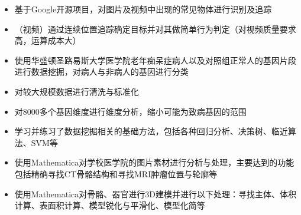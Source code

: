 \documentclass[9pt,a4paper]{altacv}
\begin{document}
\begin{fullwidth}
\begin{multicols}{2}
		\divider
		
		
		
		\begin{itemize}
			\item 基于Google开源项目，对图片及视频中出现的常见物体进行识别及追踪
			\item （视频）通过连续位置追踪确定目标并对其做简单行为判定（对视频质量要求高，运算成本大）
		\end{itemize}
		
		\divider
		
		\begin{itemize}
			\item 使用华盛顿圣路易斯大学医学院老年痴呆症病人以及对照组正常人的基因片段进行数据挖掘，对病人与非病人的基因进行分类
			\item 对较大规模数据进行清洗与标准化
			\item 对8000多个基因维度进行维度分析，缩小可能为致病基因的范围
			\item 学习并练习了数据挖掘相关的基础方法，包括各种回归分析、决策树、临近算法、SVM等
		\end{itemize}
		
		\divider
		
		\begin{itemize}
			\item 使用Mathematica对学校医学院的图片素材进行分析与处理，主要达到的功能包括精确寻找CT骨骼结构和寻找MRI肿瘤位置与轮廓等
			\item 使用Mathematica对骨骼、器官进行3D建模并进行以下处理：寻找主体、体积计算、表面积计算、模型锐化与平滑化、模型化简等
		\end{itemize}
		

\end{multicols}
\end{fullwidth}
\end{document}
